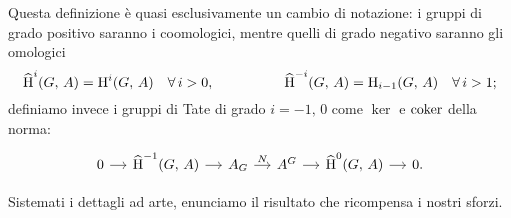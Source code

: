 \begin{definition}
	Questa definizione è quasi esclusivamente un cambio di notazione: i gruppi di grado positivo saranno i coomologici, mentre quelli di grado negativo saranno gli omologici
	\[ \operatorname{\widehat{H}}^i(G, \, A) = \operatorname{H}^i(G, \, A) \quad \forall\, i > 0, \qquad\quad\qquad \operatorname{\widehat{H}}^{-i}(G, \, A) = \operatorname{H}_{i-1}(G, \, A) \quad \forall\, i > 1;
	 \]
	 definiamo invece i gruppi di Tate di grado $ i = -1, \, 0 $ come $ \ker $ e $ \operatorname{coker} $ della norma:
	 \begin{equation}
	 	\begin{tikzcd}[column sep = small]
	 	0 \rar& \Hh^{-1}(G, \, A) \rar& A_G \rar["N"]& A^G \rar&\Hh^0(G, \, A) \rar& 0.
	 	\end{tikzcd}
	 \end{equation}
\end{definition}

Sistemati i dettagli ad arte, enunciamo il risultato che ricompensa i nostri sforzi.

